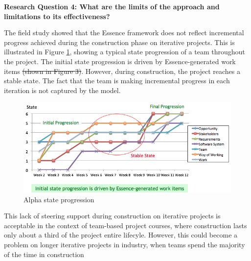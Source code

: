 \documentclass[preprint,12pt,3p]{elsarticle}
\begin{document}
\textbf{Research Question 4: What are the limits of the approach and limitations to its effectiveness?}

The field study showed that the Essence framework does not reflect incremental progress achieved during the  construction phase on iterative projects. This is illustrated in Figure \ref{AlphaStateProgression}, showing a typical state progression of a team throughout the project. The initial state progression is driven by Essence-generated work items \sout{(shown in Figure 3)}. However, during construction, the project reaches a stable state. The fact that the team is making incremental progress in each iteration is not captured by the model. 

\begin{figure}[h]\vspace*{4pt}
\centerline{\includegraphics[width=5.4in]{field_study_images/AlphaStateProgression}}
\caption{Alpha state progression}\vspace*{-6pt}\label{AlphaStateProgression}
\end{figure}


This lack of steering support during construction on iterative projects is acceptable in the context of team-based project courses, where construction lasts only about a third of the project entire lifecyle. However, this could become a problem on longer iterative projects in industry, when teams spend the majority of the time in construction

\end{document}
